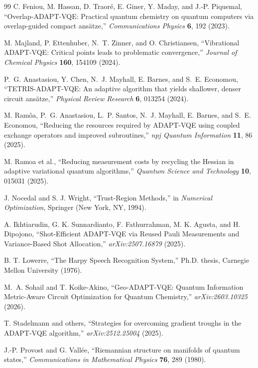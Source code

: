 \documentclass[
  reprint,
  amsmath,
  amssymb,
  aps,
  pra,
  nofootinbib,
  superscriptaddress,
  floatfix
]{revtex4-2}
\begin{document}
\begin{thebibliography}{99}
C. Feniou, M. Hassan, D. Traor\'e, E. Giner, Y. Maday, and J.-P. Piquemal,
``Overlap-ADAPT-VQE: Practical quantum chemistry on quantum computers via overlap-guided compact ans\"atze,''
\emph{Communications Physics} \textbf{6}, 192 (2023).

M. Majland, P. Ettenhuber, N.~T. Zinner, and O. Christiansen,
``Vibrational ADAPT-VQE: Critical points leads to problematic convergence,''
\emph{Journal of Chemical Physics} \textbf{160}, 154109 (2024).

P.~G. Anastasiou, Y. Chen, N.~J. Mayhall, E. Barnes, and S.~E. Economou,
``TETRIS-ADAPT-VQE: An adaptive algorithm that yields shallower, denser circuit ans\"atze,''
\emph{Physical Review Research} \textbf{6}, 013254 (2024).

M. Ram\^oa, P.~G. Anastasiou, L.~P. Santos, N.~J. Mayhall, E. Barnes, and S.~E. Economou,
``Reducing the resources required by ADAPT-VQE using coupled exchange operators and improved subroutines,''
\emph{npj Quantum Information} \textbf{11}, 86 (2025).

M. Ramoa et al.,
``Reducing measurement costs by recycling the Hessian in adaptive variational quantum algorithms,''
\emph{Quantum Science and Technology} \textbf{10}, 015031 (2025).

J. Nocedal and S. J. Wright,
``Trust-Region Methods,''
in \emph{Numerical Optimization}, Springer (New York, NY, 1994).

A. Ikhtiarudin, G. K. Sunnardianto, F. Fathurrahman, M. K. Agusta, and H. Dipojono,
``Shot-Efficient ADAPT-VQE via Reused Pauli Measurements and Variance-Based Shot Allocation,''
\emph{arXiv:2507.16879} (2025).

B. T. Lowerre,
``The Harpy Speech Recognition System,''
Ph.D. thesis, Carnegie Mellon University (1976).

M.~A. Sohail and T. Koike-Akino,
``Geo-ADAPT-VQE: Quantum Information Metric-Aware Circuit Optimization for Quantum Chemistry,''
\emph{arXiv:2603.10325} (2026).

T. Stadelmann and others,
``Strategies for overcoming gradient troughs in the ADAPT-VQE algorithm,''
\emph{arXiv:2512.25004} (2025).

J.-P. Provost and G. Vall\'ee,
``Riemannian structure on manifolds of quantum states,''
\emph{Communications in Mathematical Physics} \textbf{76}, 289 (1980).


\end{thebibliography}
\end{document}
